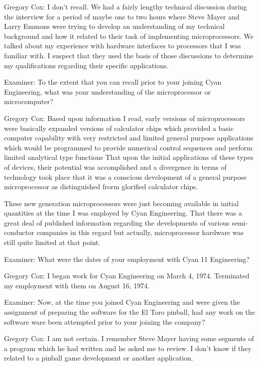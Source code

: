 \textcolor{interviewee}{Gregory Cox:} I don’t recall. We had a fairly lengthy technical discussion during the interview for a period of maybe one to two hours where Steve Mayer and Larry Emmons were trying to develop an understanding of my technical background and how it related to their task of implementing microprocessors. We talked about my experience with hardware interfaces to processors that I was familiar with. I suspect that they used the basis of those discussions to determine my qualifications regarding their specific applications. 

\textcolor{interviewer}{Examiner:} To the extent that you can recall prior to your joining Cyan Engineering, what was your understanding of the microprocessor or microcomputer? 

\textcolor{interviewee}{Gregory Cox:} Based upon information I read, early versions of microprocessors were basically expanded versions of calculator chips which provided a basic computer capability with very restricted and limited general purpose applications which would be programmed to provide numerical control sequences and perform limited analytical type functions That upon the initial applications of these types of devices, their potential was accomplished and a divergence in terms of technology took place that it was a conscious development of a general purpose microprocessor as distinguished frorm glorified calculator chips.

These new generation microprocessors were just becoming available in initial quantities at the time I was employed by Cyan Engineering. That there was a great deal of published information regarding the developments of various semi-conductor companies in this regard but actually, microprocessor hardware was still quite limited at that point. 

\textcolor{interviewer}{Examiner:} What were the dates of your employment with Cyan 11 Engineering? 

\textcolor{interviewee}{Gregory Cox:} I began work for Cyan Engineering on March 4, 1974. Terminated my employment with them on August 16, 1974. 

\textcolor{interviewer}{Examiner:} Now, at the time you joined Cyan Engineering and were given the assignment of preparing the software for the El Toro pinball, had any work on the software ware been attempted prior to your joining the company? 

\textcolor{interviewee}{Gregory Cox:} I am not certain. I remember Steve Mayer having some segments of a program which he had written and he asked me to review.  I don't know if they related to a pinball game development or another application.

